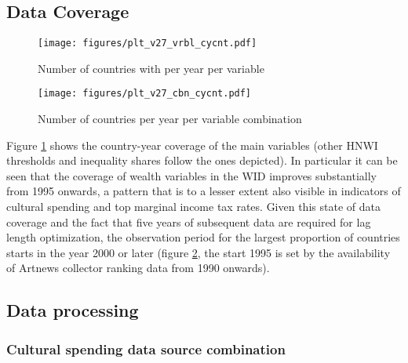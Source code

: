 \documentclass[11pt]{article}
\begin{document}
\renewcommand{\thesubsection}{\Alph{subsection}}



\subsection{Data Coverage}
\label{app_data_coverage}
\begin{figure}[htbp]
\centering
\texttt{[image: figures/plt\_v27\_vrbl\_cycnt.pdf]}
\caption{\label{fig:vrbl_cycnt}Number of countries with per year per variable}
\end{figure}



\begin{figure}[htbp]
\centering
\texttt{[image: figures/plt\_v27\_cbn\_cycnt.pdf]}
\caption{\label{fig:cbn_cycnt}Number of countries per year per variable combination}
\end{figure}



Figure \ref{fig:vrbl_cycnt} shows the country-year coverage of the main variables (other HNWI thresholds and inequality shares follow the ones depicted).
In particular it can be seen that the coverage of wealth variables in the WID improves substantially from 1995 onwards, a pattern that is to a lesser extent also visible in indicators of cultural spending and top marginal income tax rates.
Given this state of data coverage and the fact that five years of subsequent data are required for lag length optimization, the observation period for the largest proportion of countries starts in the year 2000 or later  (figure \ref{fig:cbn_cycnt}, the start 1995 is set by the availability of Artnews collector ranking data from 1990 onwards).





\subsection{Data processing}
\label{app_data_processing}
\subsubsection{Cultural spending data source combination}
\end{document}
